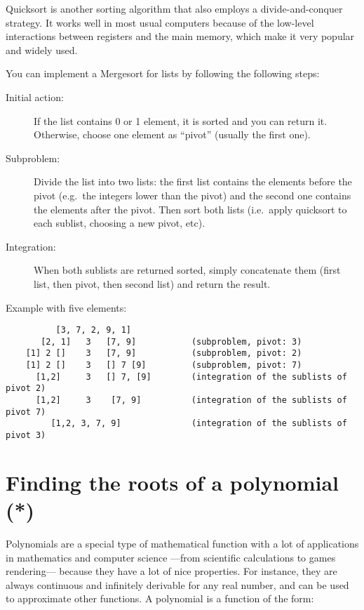 \documentclass{article}
\begin{document}
Quicksort is another sorting algorithm that also employs a
divide-and-conquer strategy. It works well in most usual computers
because of the low-level interactions between registers and the main
memory, which make it very popular and widely used. 

You can implement a Mergesort for lists
by following the following steps: 

\begin{description}
\item[Initial action: ] If the list contains 0 or 1 element, it is
  sorted and you can return it. Otherwise, choose one element as
  ``pivot'' (usually the first one). 
\item[Subproblem: ] Divide the
  list into two lists: the first list contains the elements before the
  pivot (e.g.~the integers lower than the pivot) and the second one
  contains the elements after the pivot. Then sort both lists
  (i.e.~apply quicksort to each sublist, choosing a new pivot, etc).
\item[Integration: ] When both sublists are returned sorted,
  simply concatenate them (first list, then pivot, then second list)
  and return the result.
\end{description}

Example with five elements: 

\begin{verbatim}
          [3, 7, 2, 9, 1]            
       [2, 1]   3   [7, 9]           (subproblem, pivot: 3)
    [1] 2 []    3   [7, 9]           (subproblem, pivot: 2)   
    [1] 2 []    3   [] 7 [9]         (subproblem, pivot: 7)
      [1,2]     3   [] 7, [9]        (integration of the sublists of pivot 2)
      [1,2]     3    [7, 9]          (integration of the sublists of pivot 7)
         [1,2, 3, 7, 9]              (integration of the sublists of pivot 3)
\end{verbatim}

\section{Finding the roots of a polynomial (*)}
\label{sec:find-roots-polyn}

Polynomials are a special type of mathematical function with a lot of
applications in mathematics and computer science ---from scientific
calculations to games rendering--- because they have a lot of nice
properties. For instance, they are always continuous and infinitely
derivable for any real number, and can be used to approximate other
functions. A polynomial is a function of the form:
\end{document}

